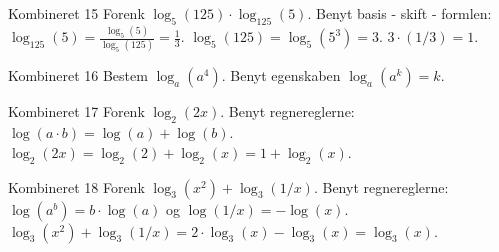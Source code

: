 \documentclass{article}
\begin{document}
\newpage

\begin{exercise}{Kombineret 15}
Forenk $\log_5(125) \cdot \log_{125}(5)$.
\hint
Benyt basis - skift - formlen: $\log_{125}(5) = \frac{\log_5(5)}{\log_5(125)} = \frac{1}{3}$.
\hint
$\log_5(125) = \log_5(5^3) = 3$.
\hint
$3 \cdot (1/3) = 1$.
\end{exercise}

\newpage

\begin{exercise}{Kombineret 16}
Bestem $\log_{a}(a^4)$.
\hint
Benyt egenskaben $\log_a(a^k) = k$.
\end{exercise}

\newpage

\begin{exercise}{Kombineret 17}
Forenk $\log_{2}(2x)$.
\hint
Benyt regnereglerne: $\log(a \cdot b) = \log(a) + \log(b)$.
\hint
$\log_2(2x) = \log_2(2) + \log_2(x) = 1 + \log_2(x)$.
\end{exercise}

\newpage

\begin{exercise}{Kombineret 18}
Forenk $\log_3(x^2) + \log_3(1/x)$.
\hint
Benyt regnereglerne: $\log(a^b) = b \cdot \log(a)$ og $\log(1/x) = - \log(x)$.
\hint
$\log_3(x^2) + \log_3(1/x) = 2 \cdot \log_3(x) - \log_3(x) = \log_3(x)$.
\end{exercise}

\newpage
\end{document}
